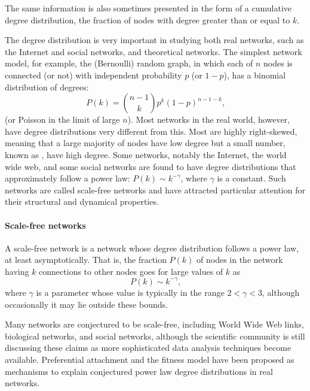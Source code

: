       The same information is also sometimes presented in the form of a cumulative degree distribution, the fraction of nodes with degree greater than or equal to $k$.
      
      The degree distribution is very important in studying both real networks, such as the Internet and social networks, and theoretical networks. The simplest network model, for example, the (Bernoulli) random graph, in which each of $n$ nodes is connected (or not) with independent probability $p$ (or $1 − p$), has a binomial distribution of degrees:
      \begin{equation}
        P(k) = \binom{n-1}{k} p^k (1 - p)^{n-1-k}\mbox{,}
      \end{equation}
      (or Poisson in the limit of large $n$). Most networks in the real world, however, have degree distributions very different from this. Most are highly right-skewed, meaning that a large majority of nodes have low degree but a small number, known as , have high degree. Some networks, notably the Internet, the world wide web, and some social networks are found to have degree distributions that approximately follow a power law: $P(k) \sim k^{−\gamma}$, where $\gamma$ is a constant. Such networks are called scale-free networks and have attracted particular attention for their structural and dynamical properties.
      
      \paragraph{Scale-free networks}
  
        A scale-free network is a network whose degree distribution follows a power law, at least asymptotically. That is, the fraction $P(k)$ of nodes in the network having $k$ connections to other nodes goes for large values of $k$ as
    \begin{equation}
      P(k) \sim k^{-\gamma} \mbox{,}
    \end{equation}
    where $\gamma$ is a parameter whose value is typically in the range $2 < \gamma < 3$, although occasionally it may lie outside these bounds\cite{OnnelaSaramakiBarabasi2007,ChoromanskiMatuszakMiekisz2013}.

        Many networks are conjectured to be scale-free, including World Wide Web links, biological networks, and social networks, although the scientific community is still discussing these claims as more sophisticated data analysis techniques become available\cite{ClausetShaliziNewman2007}. Preferential attachment and the fitness model have been proposed as mechanisms to explain conjectured power law degree distributions in real networks.
        
